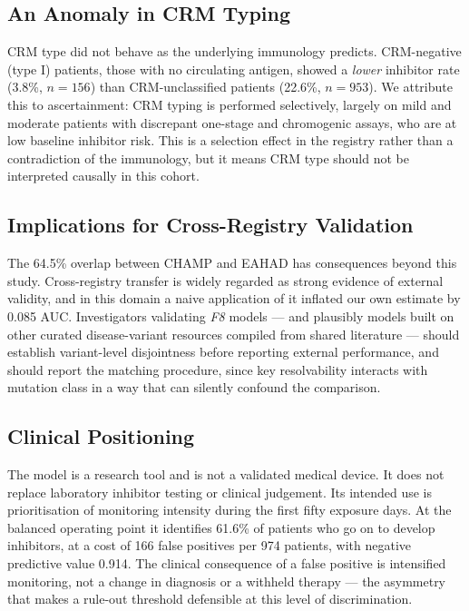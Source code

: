 \documentclass[conference]{IEEEtran}
\begin{document}
\subsection{An Anomaly in CRM Typing}
CRM type did not behave as the underlying immunology predicts. CRM-negative
(type I) patients, those with no circulating antigen, showed a \textit{lower}
inhibitor rate (3.8\%, $n = 156$) than CRM-unclassified patients (22.6\%,
$n = 953$). We attribute this to ascertainment: CRM typing is performed
selectively, largely on mild and moderate patients with discrepant one-stage
and chromogenic assays, who are at low baseline inhibitor risk. This is a
selection effect in the registry rather than a contradiction of the
immunology, but it means CRM type should not be interpreted causally in this
cohort.

\subsection{Implications for Cross-Registry Validation}
The 64.5\% overlap between CHAMP and EAHAD has consequences beyond this study.
Cross-registry transfer is widely regarded as strong evidence of external
validity, and in this domain a naive application of it inflated our own
estimate by 0.085 AUC. Investigators validating \textit{F8} models --- and
plausibly models built on other curated disease-variant resources compiled from
shared literature --- should establish variant-level disjointness before
reporting external performance, and should report the matching procedure, since
key resolvability interacts with mutation class in a way that can silently
confound the comparison.

\subsection{Clinical Positioning}
The model is a research tool and is not a validated medical device. It does not
replace laboratory inhibitor testing or clinical judgement. Its intended use is
prioritisation of monitoring intensity during the first fifty exposure days. At
the balanced operating point it identifies 61.6\% of patients who go on to
develop inhibitors, at a cost of 166 false positives per 974 patients, with
negative predictive value 0.914. The clinical consequence of a false positive
is intensified monitoring, not a change in diagnosis or a withheld therapy ---
the asymmetry that makes a rule-out threshold defensible at this level of
discrimination.
\end{document}
